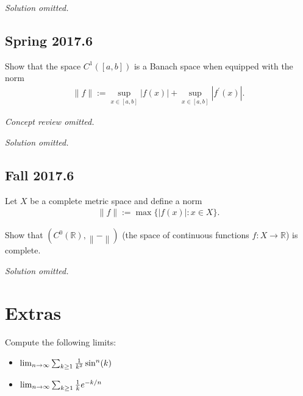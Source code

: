 
\emph{Solution omitted.}

\hypertarget{spring-2017.6}{%
\subsection{Spring 2017.6}\label{spring-2017.6}}

Show that the space \(C^1([a, b])\) is a Banach space when equipped with
the norm
\begin{align*}
\|f\|:=\sup _{x \in[a, b]}|f(x)|+\sup _{x \in[a, b]}\left|f^{\prime}(x)\right|.
\end{align*}


\emph{Concept review omitted.}

\emph{Solution omitted.}

\hypertarget{fall-2017.6}{%
\subsection{Fall 2017.6}\label{fall-2017.6}}

Let \(X\) be a complete metric space and define a norm
\begin{align*}
\|f\|:=\max \{|f(x)|: x \in X\}.
\end{align*}

Show that \((C^0({\mathbb{R}}), {\left\lVert {{-}} \right\rVert} )\)
(the space of continuous functions \(f: X\to {\mathbb{R}}\)) is
complete.


\emph{Solution omitted.}

\hypertarget{extras}{%
\section{Extras}\label{extras}}

\begin{exercise}[?]

Compute the following limits:

\begin{itemize}
\tightlist
\item
  \(\lim_{n\to\infty} \sum_{k\geq 1} {1\over k^2} \sin^n(k)\)
\item
  \(\lim_{n\to\infty} \sum_{k\geq 1} {1\over k} e^{-k/n}\)
\end{itemize}

\end{exercise}

